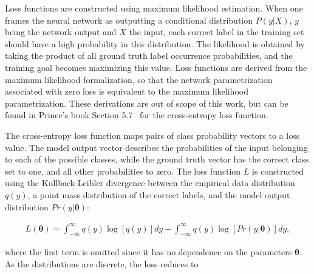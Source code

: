 \documentclass[english,twoside,openright]{UH_DS_MSc}
\begin{document}
Loss functions are constructed using maximum likelihood estimation. When one frames the neural network as outputting 
a conditional distribution $P(y|X)$, $y$ being the network output and $X$ the input, each correct label in the 
training set should have a high probability in this distribution. The likelihood is obtained by taking the product of 
all ground truth label occurrence probabilities, and the training goal becomes maximizing this value. Loss functions are derived 
from the maximum likelihood formalization, so that the network parametrization associated with zero loss is equivalent to 
the maximum likelihood parametrization. These derivations are out of scope of this work, but can be found in Prince's book
Section 5.7~\cite{princebook} for the cross-entropy loss function.

The cross-entropy loss function maps pairs of class probability vectors 
to a loss value. The model output vector describes the probabilities 
of the input belonging to each of the possible classes, while the ground
 truth vector has the correct 
class set to one, and all other probabilities to zero. The loss function $L$ 
is constructed using the Kullback-Leibler divergence between the empirical data distribution $q(y)$,
a point mass distribution of the correct labels,
 and the model output distribution 
$Pr(y|\mathbf{\theta})$:

\begin{align}
    L(\mathbf{\theta})=\int_{-\infty}^{\infty}q(y)\log[q(y)]dy-\int_{-\infty}^{\infty}q(y)\log[Pr(y|\mathbf{\theta})]dy,
\end{align}

where the first term is omitted since it has no dependence on the parameters $\mathbf{\theta}$.
As the distributions are discrete, the loss reduces to
\end{document}
